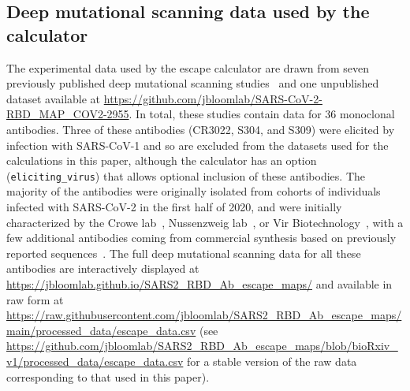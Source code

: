 \documentclass[9pt,twocolumn,twoside]{gsajnl_modified}
\begin{document}
{\subsection{Deep mutational scanning data used by the calculator}
The experimental data used by the escape calculator are drawn from seven previously published deep mutational scanning studies~\citep{greaney2021complete,greaney2021mapping,starr2021prospective,starr2021complete,starr2021sars,dong2021genetic,tortorici2021broad} and one unpublished dataset available at \url{https://github.com/jbloomlab/SARS-CoV-2-RBD_MAP_COV2-2955}.
In total, these studies contain data for 36 monoclonal antibodies.
Three of these antibodies (CR3022, S304, and S309) were elicited by infection with SARS-CoV-1 and so are excluded from the datasets used for the calculations in this paper, although the calculator has an option (\texttt{eliciting\_virus}) that allows optional inclusion of these antibodies.
The majority of the antibodies were originally isolated from cohorts of individuals infected with SARS-CoV-2 in the first half of 2020, and were initially characterized by the Crowe lab~\citep{zost2020potently}, Nussenzweig lab~\citep{robbiani2020convergent}, or Vir Biotechnology~\citep{piccoli2020mapping}, with a few additional antibodies coming from commercial synthesis based on previously reported sequences~\citep{hansen2020studies,jones2021neutralizing,shi2020human}.
The full deep mutational scanning data for all these antibodies are interactively displayed at \url{https://jbloomlab.github.io/SARS2_RBD_Ab_escape_maps/} and available in raw form at \url{https://raw.githubusercontent.com/jbloomlab/SARS2_RBD_Ab_escape_maps/main/processed_data/escape_data.csv} (see \url{https://github.com/jbloomlab/SARS2_RBD_Ab_escape_maps/blob/bioRxiv_v1/processed_data/escape_data.csv} for a stable version of the raw data corresponding to that used in this paper).

}
\end{document}
